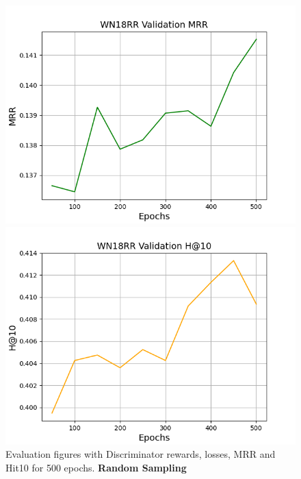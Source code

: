 \begin{figure}
\begin{minipage}{.5\textwidth}
      \includegraphics[width=0.9\linewidth]{appendices/wn18rr/gan_train_wn18rr_mrr.png}
    \end{minipage}%
    \begin{minipage}{.5\textwidth}
      \centering
      \includegraphics[width=0.9\linewidth]{appendices/wn18rr/gan_train_wn18rr_hit10.png}
    \end{minipage}
    \caption{Evaluation figures with Discriminator rewards, losses, \ac{MRR} and Hit\@10 for 500 epochs. \textbf{Random Sampling}  }
    \label{fig:test}
\end{figure}


